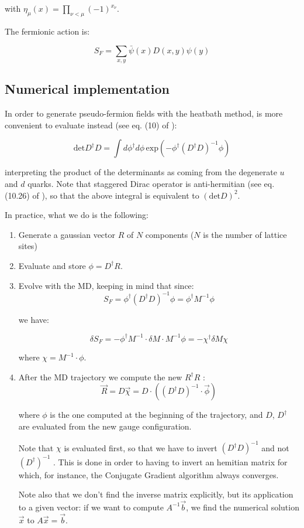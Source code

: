 \documentclass[12pt, a4paper]{article}
\begin{document}
with $\eta_{\mu}(x) = \prod_{\nu<\mu} (-1)^{x_{\nu}}$.

The fermionic action is:

\begin{equation}
S_F = \sum_{x, y} \bar{\psi}(x) D(x,y) \psi(y)
\end{equation}

\subsection{Numerical implementation}

In order to generate pseudo-fermion fields with the heatbath method, is more convenient to evaluate instead (see eq. (10) of \cite{BITAR1989377}):

$$
\text{det} D^{\dagger} D = 
\int d \phi^{\dagger} d \phi 
\, \text{exp}(-\phi^{\dagger} (D^{\dagger} D)^{-1} \phi)
$$

interpreting the product of the determinants as coming from the degenerate $u$ and $d$ quarks. 
Note that staggered Dirac operator is anti-hermitian 
(see eq. (10.26) of \cite{gattringer2009quantum}), 
so that the above integral is equivalent to $( \text{det} D)^2$.

In practice, what we do is the following:

\begin{enumerate}
    \item
    Generate a gaussian vector $R$ of $N$ components 
    ($N$ is the number of lattice sites)
    \item
    Evaluate and store $\phi = D^{\dagger} R$.
    \item
    Evolve with the MD, keeping in mind that since:
    $$
    S_F = 
    \phi^{\dagger} (D^{\dagger} D)^{-1} \phi = 
    \phi^{\dagger} M^{-1} \phi
    $$
    
    we have:
    
    \begin{equation} \label{eq:dSF.generic}
    \delta S_F 
    = - \phi^{\dagger} M^{-1} \cdot \delta M \cdot M^{-1} \phi 
    = - \chi^{\dagger} \delta M \chi
    \end{equation}

    
    where $\chi = M^{-1} \cdot \phi$.
    \item
    After the MD trajectory we compute the new $R^{\dagger} R$ :
    $$
    \vec{R} = D \vec{\chi} = D \cdot ( (D^{\dagger} D)^{-1} \cdot \vec{\phi})
    $$
    
    where $\phi$ is the one computed at the beginning of the trajectory, 
    and $D$, $D^{\dagger}$ are evaluated from the new gauge configuration. 
    
    Note that $\chi$ is evaluated first, 
    so that we have to invert $(D^{\dagger} D)^{-1}$ and not $(D^{\dagger})^{-1}$ . 
    This is done in order to having to invert an hemitian matrix for which, for instance, 
    the Conjugate Gradient algorithm always converges.
    
    Note also that we don't find the inverse matrix explicitly, 
    but its application to a given vector: 
    if we want to compute $A^{-1} \vec{b}$, 
    we find the numerical solution $\vec{x}$ to $A \vec{x} = \vec{b}$.
\end{enumerate}
\end{document}
